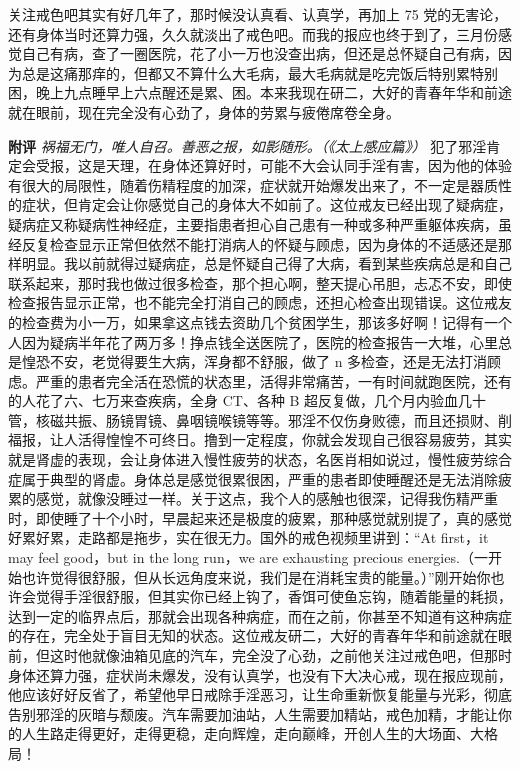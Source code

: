 \begin{case}
    关注戒色吧其实有好几年了，那时候没认真看、认真学，再加上 75 党的无害论，还有身体当时还算力强，久久就淡出了戒色吧。而我的报应也终于到了，三月份感觉自己有病，查了一圈医院，花了小一万也没查出病，但还是总怀疑自己有病，因为总是这痛那痒的，但都又不算什么大毛病，最大毛病就是吃完饭后特别累特别困，晚上九点睡早上六点醒还是累、困。本来我现在研二，大好的青春年华和前途就在眼前，现在完全没有心劲了，身体的劳累与疲倦席卷全身。

    \textbf{附评} \textit{祸福无门，唯人自召。善恶之报，如影随形。（《太上感应篇》）} 犯了邪淫肯定会受报，这是天理，在身体还算好时，可能不大会认同手淫有害，因为他的体验有很大的局限性，随着伤精程度的加深，症状就开始爆发出来了，不一定是器质性的症状，但肯定会让你感觉自己的身体大不如前了。这位戒友已经出现了疑病症，疑病症又称疑病性神经症，主要指患者担心自己患有一种或多种严重躯体疾病，虽经反复检查显示正常但依然不能打消病人的怀疑与顾虑，因为身体的不适感还是那样明显。我以前就得过疑病症，总是怀疑自己得了大病，看到某些疾病总是和自己联系起来，那时我也做过很多检查，那个担心啊，整天提心吊胆，忐忑不安，即使检查报告显示正常，也不能完全打消自己的顾虑，还担心检查出现错误。这位戒友的检查费为小一万，如果拿这点钱去资助几个贫困学生，那该多好啊！记得有一个人因为疑病半年花了两万多！挣点钱全送医院了，医院的检查报告一大堆，心里总是惶恐不安，老觉得要生大病，浑身都不舒服，做了 n 多检查，还是无法打消顾虑。严重的患者完全活在恐慌的状态里，活得非常痛苦，一有时间就跑医院，还有的人花了六、七万来查疾病，全身 CT、各种 B 超反复做，几个月内验血几十管，核磁共振、肠镜胃镜、鼻咽镜喉镜等等。邪淫不仅伤身败德，而且还损财、削福报，让人活得惶惶不可终日。撸到一定程度，你就会发现自己很容易疲劳，其实就是肾虚的表现，会让身体进入慢性疲劳的状态，名医肖相如说过，慢性疲劳综合症属于典型的肾虚。身体总是感觉很累很困，严重的患者即使睡醒还是无法消除疲累的感觉，就像没睡过一样。关于这点，我个人的感触也很深，记得我伤精严重时，即使睡了十个小时，早晨起来还是极度的疲累，那种感觉就别提了，真的感觉好累好累，走路都是拖步，实在很无力。国外的戒色视频里讲到：“At first，it may feel good，but in the long run，we are exhausting precious energies.（一开始也许觉得很舒服，但从长远角度来说，我们是在消耗宝贵的能量。）”刚开始你也许会觉得手淫很舒服，但其实你已经上钩了，香饵可使鱼忘钩，随着能量的耗损，达到一定的临界点后，那就会出现各种病症，而在之前，你甚至不知道有这种病症的存在，完全处于盲目无知的状态。这位戒友研二，大好的青春年华和前途就在眼前，但这时他就像油箱见底的汽车，完全没了心劲，之前他关注过戒色吧，但那时身体还算力强，症状尚未爆发，没有认真学，也没有下大决心戒，现在报应现前，他应该好好反省了，希望他早日戒除手淫恶习，让生命重新恢复能量与光彩，彻底告别邪淫的灰暗与颓废。汽车需要加油站，人生需要加精站，戒色加精，才能让你的人生路走得更好，走得更稳，走向辉煌，走向巅峰，开创人生的大场面、大格局！
\end{case}

